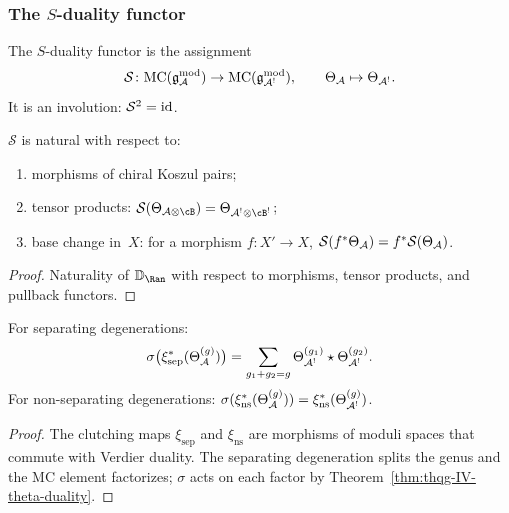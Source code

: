 \subsubsection{The $S$-duality functor}

\begin{definition}
\label{def:thqg-IV-s-functor}
The $S$-duality functor is the assignment
\[
\mathcal{S}\colon
\mathrm{MC}(\mathfrak{g}_{\mathcal{A}}^{\mathrm{mod}}) \to \mathrm{MC}(\mathfrak{g}_{\mathcal{A}^!}^{\mathrm{mod}}),
\qquad
\Theta_{\mathcal{A}} \mapsto \Theta_{\mathcal{A}^!}.
\]
It is an involution: $\mathcal{S}^2 = \mathrm{id}$.
\end{definition}

\begin{proposition}
\label{prop:thqg-IV-naturality}
$\mathcal{S}$ is natural with respect to:
\begin{enumerate}[label=\textup{(\alph*)}]
\item morphisms of chiral Koszul pairs;
\item tensor products: $\mathcal{S}(\Theta_{\cA \otimes \cB})
 = \Theta_{\cA^! \otimes \cB^!}$;
\item base change in~$X$: for a morphism $f\colon X' \to X$,
 $\mathcal{S}(f^*\Theta_{\mathcal{A}}) = f^*\mathcal{S}(\Theta_{\mathcal{A}})$.
\end{enumerate}
\end{proposition}

\begin{proof}
Naturality of $\VD_{\Ran}$ with respect to morphisms,
tensor products, and pullback functors.
\end{proof}

\begin{proposition}
\label{prop:thqg-IV-clutching}
For separating degenerations:
\begin{equation}\label{eq:thqg-IV-clutching}
\sigma\bigl(\xi_{\mathrm{sep}}^*(\Theta_{\mathcal{A}}^{(g)})\bigr)
= \sum_{g_1+g_2=g} \Theta_{\mathcal{A}^!}^{(g_1)} \star \Theta_{\mathcal{A}^!}^{(g_2)}.
\end{equation}
For non-separating degenerations:
$\sigma(\xi_{\mathrm{ns}}^*(\Theta_{\mathcal{A}}^{(g)})) = \xi_{\mathrm{ns}}^*(\Theta_{\mathcal{A}^!}^{(g)})$.
\end{proposition}

\begin{proof}
The clutching maps $\xi_{\mathrm{sep}}$ and $\xi_{\mathrm{ns}}$ are
morphisms of moduli spaces that commute with Verdier duality.
The separating degeneration splits the genus and the MC element
factorizes; $\sigma$ acts on each factor by
Theorem~\ref{thm:thqg-IV-theta-duality}.
\end{proof}

